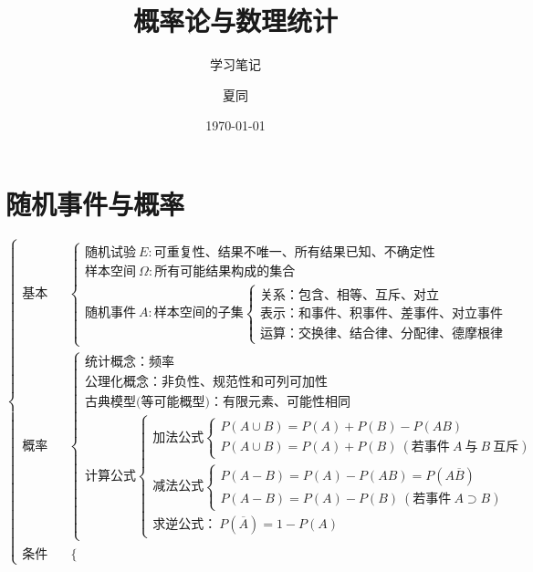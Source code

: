 ﻿\documentclass[lang=cn,11pt]{elegantbook}
\title{概率论与数理统计}
\subtitle{学习笔记}
\author{夏同}
\institute{华南理工大学}
\date{\today}
\begin{document}
\maketitle
\frontmatter

\tableofcontents
\makeenvindex

\mainmatter

\chapter{随机事件与概率}
{\scriptsize
\[
\begin{cases}
\text{基本概念} & 
\begin{cases}
\text{随机试验} \ E: \text{可重复性、结果不唯一、所有结果已知、不确定性} \\
\text{样本空间} \ \Omega: \text{所有可能结果构成的集合} \\
\text{随机事件} \ A: \text{样本空间的子集} 
\begin{cases}
\text{关系：包含、相等、互斥、对立} \\
\text{表示：和事件、积事件、差事件、对立事件} \\
\text{运算：交换律、结合律、分配律、德摩根律}
\end{cases}
\end{cases} \\
\text{概率概念} & 
\begin{cases}
\text{统计概念：频率} \\
\text{公理化概念：非负性、规范性和可列可加性} \\
\text{古典模型(等可能概型)：有限元素、可能性相同} \\
\text{计算公式}
\begin{cases}
\text{加法公式}
\begin{cases}
P(A \cup B) = P(A) + P(B) - P(AB) \\
P(A \cup B) = P(A) + P(B) \ (\text{若事件} \ A \ \text{与} \ B \ \text{互斥})
\end{cases} \\
\text{减法公式}
\begin{cases}
P(A - B) = P(A) - P(AB) = P(A\overline{B}) \\
P(A - B) = P(A) - P(B) \ (\text{若事件} \ A \supset B)
\end{cases} \\
\text{求逆公式：} \ P(\overline{A}) = 1 - P(A)
\end{cases}
\end{cases} \\
\text{条件概率概念} & 
\begin{cases}

\end{cases}
\end{cases}\]}
\end{document}
